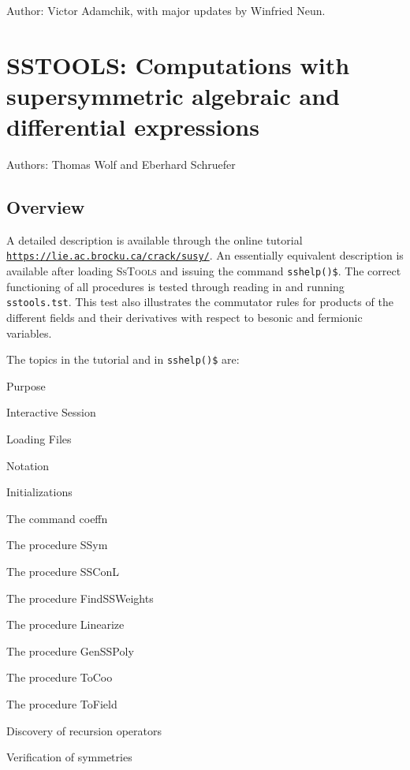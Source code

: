 Author: Victor Adamchik, with major updates by Winfried Neun.


\newpage

\section{SSTOOLS: Computations with supersymmetric algebraic and differential
expressions}


Authors: Thomas Wolf and Eberhard Schruefer

\begin{cbunit}

\subsection{Overview}
A detailed description is available through the online tutorial \\
\texttt{\url{https://lie.ac.brocku.ca/crack/susy/}}. An essentially equivalent 
description is available after loading \textsc{SsTools} and issuing the command
\texttt{sshelp()\$}. The correct functioning of all procedures is tested through
reading in and running \texttt{sstools.tst}. This test also illustrates
the commutator rules for products of the different fields and their
derivatives with respect to besonic and fermionic variables.

The topics in the tutorial and in \texttt{sshelp()\$} are:
\begin{description} 
\item{Purpose}
\item{Interactive Session}
\item{Loading Files}
\item{Notation}
\item{Initializations}
\item{The command coeffn}
\item{The procedure SSym}
\item{The procedure SSConL}
\item{The procedure FindSSWeights}
\item{The procedure Linearize}
\item{The procedure GenSSPoly}
\item{The procedure ToCoo}
\item{The procedure ToField}
\item{Discovery of recursion operators}
\item{Verification of symmetries}
\end{description}



\end{cbunit}
